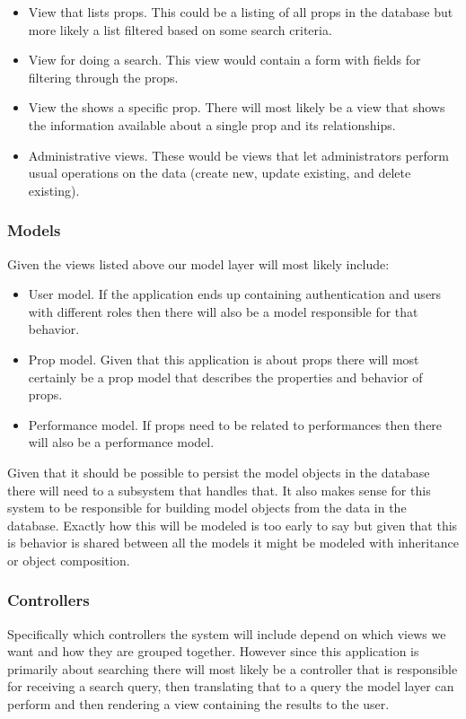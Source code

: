 \documentclass[12pt]{article}
\begin{document}
\begin{itemize}
  \item View that lists props. This could be a listing of all props in the database but more likely a list filtered based on some search criteria.
  \item View for doing a search. This view would contain a form with fields for filtering through the props.
  \item View the shows a specific prop. There will most likely be a view that shows the information available about a single prop and its relationships.
  \item Administrative views. These would be views that let administrators perform usual operations on the data (create new, update existing, and delete existing).
\end{itemize}

\subsubsection{Models}
Given the views listed above our model layer will most likely include:

\begin{itemize}
  \item User model. If the application ends up containing authentication and users with different roles then there will also be a model responsible for that behavior.
  \item Prop model. Given that this application is about props there will most certainly be a prop model that describes the properties and behavior of props.
  \item Performance model. If props need to be related to performances then there will also be a performance model.
\end{itemize}
Given that it should be possible to persist the model objects in the database
there will need to a subsystem that handles that. It also makes sense for this
system to be responsible for building model objects from the data in the
database. Exactly how this will be modeled is too early to say but given that
this is behavior is shared between all the models it might be modeled with
inheritance or object composition.
\subsubsection{Controllers}
Specifically which controllers the system will include depend on which views we
want and how they are grouped together. However since this application is
primarily about searching there will most likely be a controller that is
responsible for receiving a search query, then translating that to a query the
model layer can perform and then rendering a view containing the results to the
user.
\end{document}
